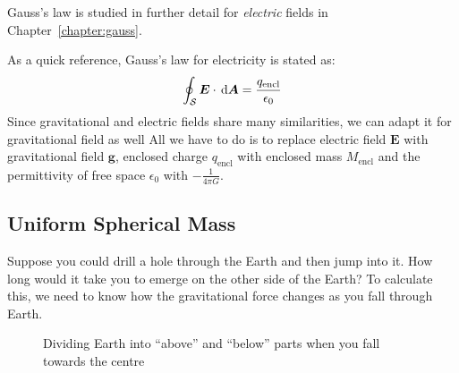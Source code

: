 Gauss's law is studied in further detail for \emph{electric} fields in
Chapter~\ref{chapter:gauss}.
\begin{remark}
  As a quick reference, Gauss's law for electricity is stated as:
  \begin{equation*}
    \oint_{\mathcal S}\bm E\cdot\dl{\bm A}=\frac{q_\text{encl}}{\epsilon_0}
  \end{equation*}
  Since gravitational and electric fields share many similarities, we can adapt
  it for gravitational field as well All we have to do is to replace electric
  field $\bm E$ with gravitational field $\bm g$, enclosed charge
  $q_\text{encl}$ with enclosed mass $M_\text{encl}$ and the permittivity of
  free space $\epsilon_0$ with $-\frac1{4\pi G}$.
\end{remark}





\subsection{Uniform Spherical Mass}

Suppose you could drill a hole through the Earth and then jump into it. How
long would it take you to emerge on the other side of the Earth? To calculate
this, we need to know how the gravitational force changes as you fall through
Earth.

\begin{figure}[ht]
  \centering
  \caption{Dividing Earth into ``above'' and ``below'' parts when you fall
    towards the centre}
  \label{fig:above-and-below}
\end{figure}

